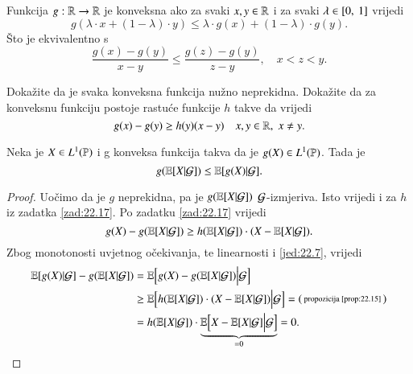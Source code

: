 Funkcija $g : \mathbb{R} \to \mathbb{R}$ je konveksna ako za svaki $x, y \in \mathbb{R}$ i za svaki $\lambda \in [{0}, \:{1}]$ vrijedi
\begin{equation*}
    g (\lambda \cdot x + (1 - \lambda) \cdot y) \leq \lambda \cdot g (x) + (1 - \lambda) \cdot g (y).
\end{equation*}
\v Sto je ekvivalentno s
\begin{equation*}
    \frac{g(x) - g(y)}{x - y} \leq \frac{g(z) - g(y)}{z - y}, \quad x < z < y.
\end{equation*}

\begin{zad} \label{zad:22.17}
    Doka\v zite da je svaka konveksna funkcija nu\v zno neprekidna.
    Doka\v zite da za konveksnu funkciju postoje rastu\' ce funkcije $h$ takve da vrijedi
    \begin{equation*}
        g(x) - g(y) \geq h(y) (x - y) \quad x, y \in \mathbb{R}, \; x \neq y.
    \end{equation*}
\end{zad}

\begin{prop}    \label{zad:22.18}
    Neka je $X \in L^1 (\mathbb{P})$ i g konveksa funkcija takva da je $g(X) \in L^1 (\mathbb{P})$.
    Tada je
    \begin{equation*}
        g (\mathbb{E} [X | \mathcal{G}]) \leq \mathbb{E} [g(X) | \mathcal{G}].
    \end{equation*}
\end{prop}

\begin{proof}
    Uo\v cimo da je $g$ neprekidna, pa je $g(\mathbb{E}[X | \mathcal{G}])$ $\mathcal{G}$-izmjeriva.
    Isto vrijedi i za $h$ iz zadatka \ref{zad:22.17}.
    Po zadatku \ref{zad:22.17} vrijedi
    \begin{equation*}
        g(X) - g(\mathbb{E}[X | \mathcal{G}]) \geq h (\mathbb{E} [X | \mathcal{G}]) \cdot (X - \mathbb{E} [X | \mathcal{G}]).
    \end{equation*}
    Zbog monotonosti uvjetnog o\v cekivanja, te linearnosti i \eqref{jed:22.7}, vrijedi
    \begin{equation*}
        \begin{aligned}
            \mathbb{E} [g(X) | \mathcal{G}] - g(\mathbb{E} [X | \mathcal{G}]) &= \mathbb{E} \Big[g(X) - g(\mathbb{E} [X | \mathcal{G}]) \Big| \mathcal{G} \Big]\\
            &\geq \mathbb{E} \Big[h (\mathbb{E} [X | \mathcal{G}]) \cdot (X - \mathbb{E} [X | \mathcal{G}]) \Big| \mathcal{G} \Big] =
            \begin{psmallmatrix}
                \textnormal{propozicija \ref{prop:22.15}}
            \end{psmallmatrix}\\
            &= h (\mathbb{E} [X | \mathcal{G}]) \cdot \underbrace{\mathbb{E} \Big[X - \mathbb{E} [X | \mathcal{G}] \Big| \mathcal{G} \Big]}_{= 0} = 0.
        \end{aligned}
    \end{equation*} 
\end{proof}